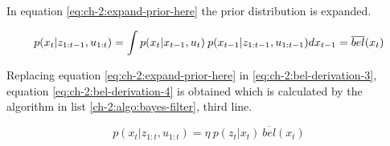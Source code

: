 In equation \ref{eq:ch-2:expand-prior-here} the prior distribution is expanded.

\begin{equation}\label{eq:ch-2:expand-prior-here}
p(x_t | z_{1:t-1}, u_{1:t}) = \int p(x_t | x_{t-1}, u_t) \: p(x_{t-1} | z_{1:t-1}, u_{1:t-1}) dx_{t-1}\\
= \overline{bel}(x_t)
\end{equation}

Replacing equation \ref{eq:ch-2:expand-prior-here} in \ref{eq:ch-2:bel-derivation-3}, equation \ref{eq:ch-2:bel-derivation-4} is obtained which is calculated by the algorithm in list \ref{ch-2:algo:bayes-filter}, third line.

\begin{equation}\label{eq:ch-2:bel-derivation-4}
p(x_t| z_{1:t}, u_{1:t}) = \eta \: p(z_t | x_t) \: \overline{bel}(x_t)
\end{equation}
